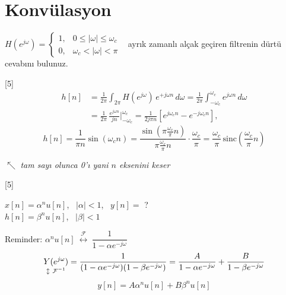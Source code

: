 \documentclass[11pt,a4paper]{article}
\begin{document}
\nopagebreak
\section{Konvülasyon}
\begin{ornek}
  $H(e^{j\omega})=\begin{cases}1, & 0\le|\omega|\le\omega_c\\ 0, & \omega_c<|\omega|<\pi\end{cases}$ \ ayrık zamanlı alçak geçiren filtrenin dürtü cevabını bulunuz.
\end{ornek}\nopagebreak
{}[5]
\begin{align*}
  h[n] &=\frac{1}{2\pi}\int_{2\pi}H(e^{j\omega})\,e^{+j\omega n}\,d\omega=\frac{1}{2\pi}\int_{-\omega_c}^{\omega_c}e^{j\omega n}\,d\omega\\
  &=\frac{1}{2\pi}\,\frac{e^{j\omega n}}{jn}\Big|_{-\omega_c}^{\omega_c}=\frac{1}{2j\pi n}\left[e^{j\omega_c n}-e^{-j\omega_c n}\right],
\end{align*}
\[ h[n]=\frac{1}{\pi n}\sin(\omega_c n)=\frac{\sin\!\left(\pi\frac{\omega_c}{\pi}n\right)}{\pi\frac{\omega_c}{\pi}n}\cdot\frac{\omega_c}{\pi}=\frac{\omega_c}{\pi}\,\mathrm{sinc}\!\left(\frac{\omega_c}{\pi}n\right) \]
\begin{flushright}
  $\nwarrow$ \textit{tam sayı olunca 0'ı yani $n$ eksenini keser}
\end{flushright}
[5]

\begin{ornek}
  $x[n]=\alpha^n u[n]$, \ $|\alpha|<1$, \ $y[n]=$ ?\\
  $h[n]=\beta^n u[n]$, \ $|\beta|<1$
\end{ornek}\nopagebreak
{\color{kirmizikalem}Reminder: $\alpha^n u[n]\ \overset{\mathcal{F}}{\longleftrightarrow}\ \dfrac{1}{1-\alpha e^{-j\omega}}$}
\[ \underset{\mathclap{\updownarrow\ \mathcal{F}^{-1}}}{Y(e^{j\omega})}=\frac{1}{(1-\alpha e^{-j\omega})(1-\beta e^{-j\omega})}=\frac{A}{1-\alpha e^{-j\omega}}+\frac{B}{1-\beta e^{-j\omega}} \]
\[ y[n]=A\alpha^n u[n]+B\beta^n u[n] \]
\end{document}
